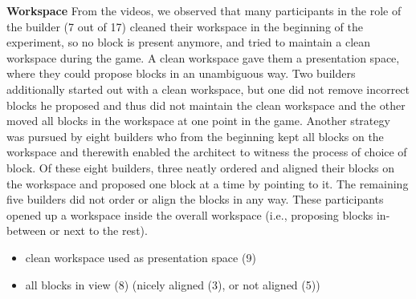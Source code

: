 \textbf{Workspace} From the videos, we observed that many participants in the role of the builder (7 out of 17) cleaned their workspace in the beginning of the experiment, so no block is present anymore, and tried to maintain a clean workspace during the game. A clean workspace gave them a presentation space, where they could propose blocks in an unambiguous way. Two builders additionally started out with a clean workspace, but one did not remove incorrect blocks he proposed and thus did not maintain the clean workspace and the other moved all blocks in the workspace at one point in the game. Another strategy was pursued by eight builders who from the beginning kept all blocks on the workspace and therewith enabled the architect to witness the process of choice of block. Of these eight builders, three neatly ordered and aligned their blocks on the workspace and proposed one block at a time by pointing to it. The remaining five builders did not order or align the blocks in any way. These participants opened up a workspace inside the overall workspace (i.e., proposing blocks in-between or next to the rest).
\begin{itemize}
\item clean workspace used as presentation space (9)
\item all blocks in view (8) (nicely aligned (3), or not aligned (5))
\end{itemize}

